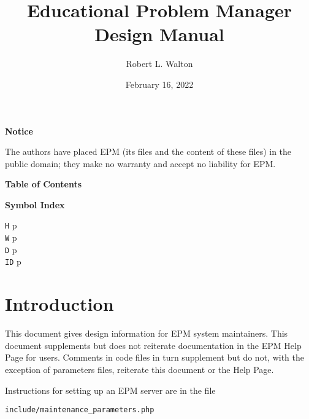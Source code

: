 \documentclass[12pt]{article}
\makeatletter
\renewcommand\tableofcontents{%
    \begin{list}{}%
	     {\setlength{\itemsep}{0in}%
	      \setlength{\topsep}{0in}%
	      \setlength{\parsep}{1ex}%
	      \setlength{\labelwidth}{0in}%
	      \setlength{\baselineskip}{1.5ex}%
	      \setlength{\leftmargin}{0.8in}%
	      \setlength{\rightmargin}{0.8in}}%
    \item\@starttoc{toc}%
    \end{list}}
\newcommand{\pagref}[1]{p\pageref{#1}}
\makeatother
\begin{document}
        
\title{Educational Problem Manager\\
Design Manual}

\author{Robert L. Walton}

\date{February 16, 2022}
 
\maketitle

\begin{center}
{\large \bf Notice}
\\[2ex]
\begin{minipage}{5.5in}
The authors have placed EPM (its files and the content of these files) in
the public domain; they make no warranty and accept
no liability for EPM.
\end{minipage}
\end{center}
\begin{center}
\large \bf Table of Contents
\end{center}

\bigskip

\tableofcontents 

\newpage

\begin{center}
{\bf Symbol Index}
\\[1ex]
\begin{minipage}{2in}
{\tt H} \dotfill \pagref{H-DIRECTORY} \\
{\tt W} \dotfill \pagref{W-DIRECTORY} \\
{\tt D} \dotfill \pagref{D-DIRECTORY} \\
{\tt ID} \dotfill \pagref{AIDS}
\end{minipage}
\end{center}


\newpage

\section{Introduction}

This document gives design information for EPM system maintainers.
This document supplements but does not reiterate
documentation in the EPM Help Page for
users.  Comments in code files in turn supplement but do not, with
the exception of parameters files,
reiterate this document or the Help Page.

Instructions for setting up an EPM server are in the file
\begin{center}
{\tt include/maintenance\_parameters.php}
\end{center}
\end{document}
